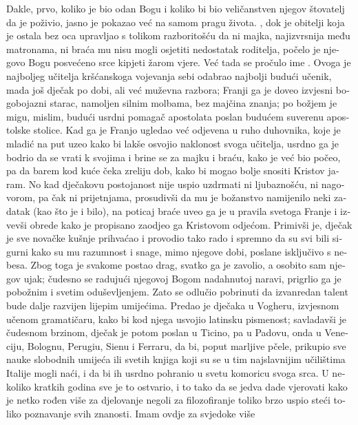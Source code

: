 \documentclass[a5paper,twoside]{article}
\begin{document}
\begin{pages}
\begin{Rightside}
\begin{croatian}
Dakle, prvo, koliko je bio odan Bogu i koliko bi bio veličanstven njegov štovatelj da je poživio, jasno je pokazao već na samom pragu života.  , dok je obitelji koja je ostala bez oca upravljao s tolikom razboritošću da ni majka, najizvrsnija među matronama, ni braća mu nisu mogli osjetiti nedostatak roditelja, počelo je njegovo Bogu posvećeno srce kipjeti žarom vjere.  Već tada se pročulo ime .  Ovoga je najboljeg učitelja kršćanskoga vojevanja sebi odabrao najbolji budući učenik, mada još dječak po dobi, ali već muževna razbora; Franji ga je doveo izvjesni bogobojazni starac, namoljen silnim molbama, bez majčina znanja; po božjem je migu, mislim, budući usrdni pomagač apostolata poslan budućem suverenu apostolske stolice.  Kad ga je Franjo ugledao već odjevena u ruho duhovnika, koje je mladić na put uzeo kako bi lakše osvojio naklonost svoga učitelja, usrdno ga je bodrio da se vrati k svojima i brine se za majku i braću, kako je već bio počeo, pa da barem kod kuće čeka zreliju dob, kako bi mogao bolje snositi Kristov jaram.  No kad dječakovu postojanost nije uspio uzdrmati ni ljubaznošću, ni nagovorom, pa čak ni prijetnjama, prosudivši da mu je božanstvo namijenilo neki zadatak (kao što je i bilo), na poticaj braće uveo ga je u pravila svetoga Franje i izvevši obrede kako je propisano zaodjeo ga Kristovom odjećom.  Primivši je, dječak je sve novačke kušnje prihvaćao i provodio tako rado i spremno da su svi bili sigurni kako su mu razumnost i snage, mimo njegove dobi, poslane isključivo s nebesa.  Zbog toga je svakome postao drag, svatko ga je zavolio, a osobito sam njegov ujak; čudesno se radujući njegovoj Bogom nadahnutoj naravi, prigrlio ga je pobožnim i svetim oduševljenjem.  Zato se odlučio pobrinuti da izvanredan talent bude dalje razvijen lijepim umijećima.  Predao je dječaka u Vogheru, izvjesnom učenom gramatičaru, kako bi kod njega usvojio latinsku pismenost; savladavši je čudesnom brzinom, dječak je potom poslan u Ticino, pa u Padovu, onda u Veneciju, Bolognu, Perugiu, Sienu i Ferraru, da bi, poput marljive pčele, prikupio sve nauke slobodnih umijeća ili svetih knjiga koji su se u tim najslavnijim učilištima Italije mogli naći, i da bi ih usrdno pohranio u svetu komoricu svoga srca.  U nekoliko kratkih godina sve je to ostvario, i to tako da se jedva dade vjerovati kako je netko rođen više za djelovanje negoli za filozofiranje toliko brzo uspio steći toliko poznavanje svih znanosti.  Imam ovdje za svjedoke više 
\end{croatian}
\end{Rightside}
\end{pages}
\end{document}
